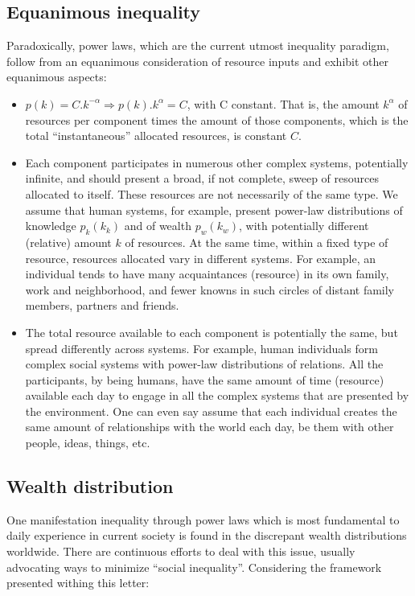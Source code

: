 \documentclass[a4paper, 11pt]{article} %
\begin{document}
\subsection{Equanimous inequality}
Paradoxically, power laws, which are the 
current utmost inequality paradigm,
follow from an equanimous consideration
of resource inputs
and exhibit other equanimous aspects:
\begin{itemize}
	\item $p(k)=C.k^{-\alpha} \Rightarrow p(k).k^{\alpha}=C$, with C constant. That is, the amount $k^\alpha$ of resources per component times the amount of those components, which is the total ``instantaneous'' allocated resources, is constant $C$.
	\item Each component participates in numerous other complex systems, potentially infinite, and should present a broad, if not complete, sweep of resources allocated to itself.
		These resources are not necessarily of the same type. We assume that human systems, for example, present power-law distributions of knowledge $p_k(k_k)$ and of wealth $p_w(k_w)$, with potentially different (relative) amount $k$ of resources. At the same time, within a fixed type of resource, resources allocated vary in  different systems. For example, an individual tends to have many acquaintances (resource) in its own family, work and neighborhood, and fewer knowns in such circles of distant family members, partners and friends.
	\item The total resource available to each component is potentially the same, but spread differently across systems. For example, human individuals form complex social systems with power-law distributions of relations. All the participants, by being humans, have the same amount of time (resource) available each day to engage in all the complex systems that are presented by the environment. One can even say assume that each individual creates the same amount of relationships with the world each day, be them with other people, ideas, things, etc. 
\end{itemize}


\subsection{Wealth distribution}
One manifestation inequality through power laws
which is most fundamental to daily experience
in current society is found in the discrepant wealth distributions worldwide.
There are continuous efforts to deal with this issue,
usually advocating ways to minimize ``social inequality''.
Considering the framework presented withing this letter:
\end{document}

